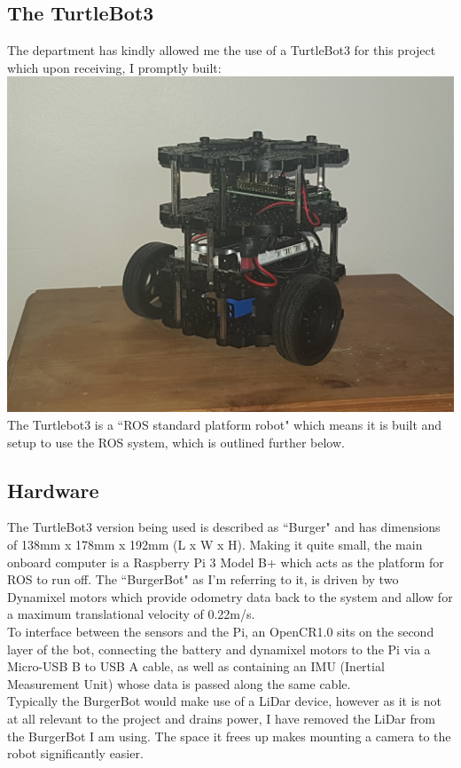 \documentclass[10pt,a4paper]{report}
\begin{document}
		\subsection*{The TurtleBot3}
			The department has kindly allowed me the use of a TurtleBot3 for this project which upon receiving, I promptly built: \\
			\includegraphics[scale=0.05]{BuiltRobot} \\
			The Turtlebot3 is a ``ROS standard platform robot"\cite{robotis_emanual} which means it is built and setup to use the ROS system, which is outlined further below.
		\subsection*{Hardware}
			The TurtleBot3 version being used is described as ``Burger" and has dimensions of 138mm x 178mm x 192mm (L x W x H). Making it quite small, the main onboard computer is a Raspberry Pi 3 Model B+ which acts as the platform for ROS to run off. The ``BurgerBot" as I'm referring to it, is driven by two Dynamixel motors which provide odometry data back to the system and allow for a maximum translational velocity of 0.22m/s.\cite{turtlebot3_specs} \\
			To interface between the sensors and the Pi, an OpenCR1.0 sits on the second layer of the bot, connecting the battery and dynamixel motors to the Pi via a Micro-USB B to USB A cable, as well as containing an IMU (Inertial Measurement Unit) whose data is passed along the same cable.\\
			Typically the BurgerBot would make use of a LiDar device, however as it is not at all relevant to the project and drains power, I have removed the LiDar from the BurgerBot I am using. The space it frees up makes mounting a camera to the robot significantly easier. 
\end{document}
